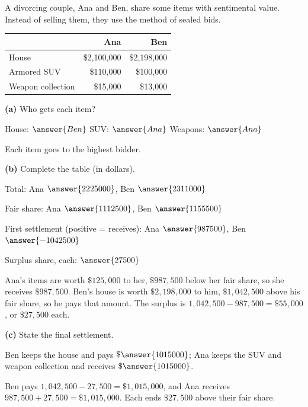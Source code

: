 \documentclass[12pt]{ximera}
\begin{document}
\begin{problem}
A divorcing couple, Ana and Ben, share some items with sentimental value. Instead of
selling them, they use the method of sealed bids.
\begin{center}
\begin{tabular}{|l|r|r|}\hline
 & \textbf{Ana} & \textbf{Ben}\\\hline
House & \$2,100,000 & \$2,198,000\\
Armored SUV & \$110,000 & \$100,000\\
Weapon collection & \$15,000 & \$13,000\\\hline
\end{tabular}
\end{center}

\begin{prompt}
\textbf{(a)} Who gets each item?

House: $\answer{Ben}$ \quad SUV: $\answer{Ana}$ \quad Weapons: $\answer{Ana}$
\begin{feedback}
Each item goes to the highest bidder.
\end{feedback}
\end{prompt}

\begin{prompt}
\textbf{(b)} Complete the table (in dollars).

Total: Ana $\answer{2225000}$, Ben $\answer{2311000}$

\smallskip
Fair share: Ana $\answer{1112500}$, Ben $\answer{1155500}$

\smallskip
First settlement (positive = receives): Ana $\answer{987500}$, Ben $\answer{-1042500}$

\smallskip
Surplus share, each: $\answer{27500}$
\begin{feedback}
Ana's items are worth $\$125{,}000$ to her, $\$987{,}500$ below her fair share, so she
receives $\$987{,}500$. Ben's house is worth $\$2{,}198{,}000$ to him,
$\$1{,}042{,}500$ above his fair share, so he pays that amount. The surplus is
$1{,}042{,}500-987{,}500=\$55{,}000$, or $\$27{,}500$ each.
\end{feedback}
\end{prompt}

\begin{prompt}
\textbf{(c)} State the final settlement.

Ben keeps the house and pays $\$\answer{1015000}$; Ana keeps the SUV and weapon
collection and receives $\$\answer{1015000}$.
\begin{feedback}
Ben pays $1{,}042{,}500-27{,}500=\$1{,}015{,}000$, and Ana receives
$987{,}500+27{,}500=\$1{,}015{,}000$. Each ends $\$27{,}500$ above their fair share.
\end{feedback}
\end{prompt}
\end{problem}
\end{document}
